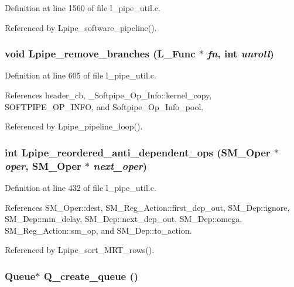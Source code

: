 Definition at line 1560 of file l\_\-pipe\_\-util.c.

Referenced by Lpipe\_\-software\_\-pipeline().
\subsubsection{\setlength{\rightskip}{0pt plus 5cm}void Lpipe\_\-remove\_\-branches (L\_\-Func $\ast$ {\em fn}, int {\em unroll})}\label{l__pipe__util_8c_c7e6b4cf559095203372239c9544b2a8}




Definition at line 605 of file l\_\-pipe\_\-util.c.

References header\_\-cb, \_\-Softpipe\_\-Op\_\-Info::kernel\_\-copy, SOFTPIPE\_\-OP\_\-INFO, and Softpipe\_\-Op\_\-Info\_\-pool.

Referenced by Lpipe\_\-pipeline\_\-loop().
\subsubsection{\setlength{\rightskip}{0pt plus 5cm}int Lpipe\_\-reordered\_\-anti\_\-dependent\_\-ops (\bf{SM\_\-Oper} $\ast$ {\em oper}, \bf{SM\_\-Oper} $\ast$ {\em next\_\-oper})}\label{l__pipe__util_8c_af2a384e21644ca71a0c7f4a3a524d8d}




Definition at line 432 of file l\_\-pipe\_\-util.c.

References SM\_\-Oper::dest, SM\_\-Reg\_\-Action::first\_\-dep\_\-out, SM\_\-Dep::ignore, SM\_\-Dep::min\_\-delay, SM\_\-Dep::next\_\-dep\_\-out, SM\_\-Dep::omega, SM\_\-Reg\_\-Action::sm\_\-op, and SM\_\-Dep::to\_\-action.

Referenced by Lpipe\_\-sort\_\-MRT\_\-rows().
\subsubsection{\setlength{\rightskip}{0pt plus 5cm}\bf{Queue}$\ast$ Q\_\-create\_\-queue ()}\label{l__pipe__util_8c_cdc1d20712bda5896582534b68c4acbf}




